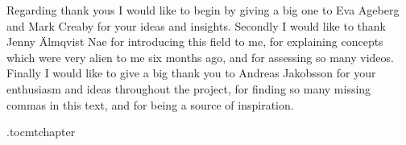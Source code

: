 {Regarding thank yous I would like to begin by giving a big one to Eva Ageberg and Mark Creaby for your ideas and insights. Secondly I would like to thank Jenny Älmqvist Nae for introducing this field to me, for explaining concepts which were very alien to me six months ago, and for assessing so many videos. Finally I would like to give a big thank you to Andreas Jakobsson for your enthusiasm and ideas throughout the project, for finding so many missing commas in this text, and for being a source of inspiration.

}

\newpage
\etocdepthtag.toc{mtchapter}
\thispagestyle{plain}
\printglossary

